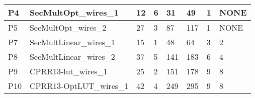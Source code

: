 \documentclass[pagesize, english, fontsize=10pt, DIV=25]{scrartcl}
\begin{document}
\begin{table}[]
{\begin{tabular}{|l|l|l|l|l|l|l|l|}
P4              & SecMultOpt\_wires\_1                          & 12                                                      & 6                                                            & 31                                                 & 49                                                             & 1                                                               & NONE                                                                \\ \hline
P5              & SecMultOpt\_wires\_2                          & 27                                                      & 3                                                            & 87                                                 & 117                                                            & 1                                                               & NONE                                                                \\ \hline
P7              & SecMultLinear\_wires\_1                       & 15                                                      & 1                                                            & 48                                                 & 64                                                             & 3                                                               & 2                                                                   \\ \hline
P8              & SecMultLinear\_wires\_2                       & 37                                                      & 5                                                            & 141                                                & 183                                                            & 6                                                               & 4                                                                   \\ \hline
P9              & CPRR13-lut\_wires\_1                          & 25                                                      & 2                                                            & 151                                                & 178                                                            & 9                                                               & 8                                                                   \\ \hline
P10             & CPRR13-OptLUT\_wires\_1                       & 42                                                      & 4                                                            & 249                                                & 295                                                            & 9                                                               & 8                                                                   \\ \hline

\end{tabular}}
\end{table}
\end{document}
